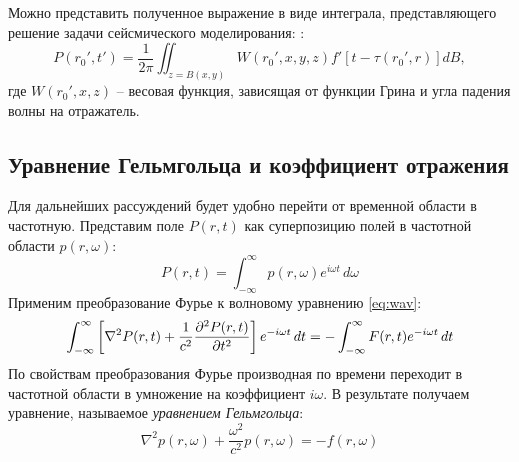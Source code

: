 \documentclass[a4paper, fontsize=14pt]{article}
\begin{document}
Можно представить полученное выражение в виде интеграла, представляющего решение задачи сейсмического моделирования: \cite{pokr}:
\begin{equation}
	P(r_0',t') = \frac{1}{2\pi} \iint_{z=B(x,y)} W(r_0',x,y,z) f'[t-\tau(r_0',r)] dB,
	\label{eq:modpokr}
\end{equation}
где $W(r_0',x,z)$ -- весовая функция, зависящая от функции Грина и угла падения волны на отражатель.
	\subsection{Уравнение Гельмгольца и коэффициент отражения}
	Для дальнейших рассуждений будет удобно перейти от временной области в частотную. Представим поле $P(r,t)$ как суперпозицию полей в частотной области $p(r,\omega)$:
	\begin{equation}
		P(r,t) =  \int_{-\infty}^{\infty} p(r,\omega) e^{i\omega t}\, d\omega
	\end{equation}
	Применим преобразование Фурье к волновому уравнению \eqref{eq:wav}:
	\begin{equation}
		\int_{-\infty}^{\infty} \left[ \nabla^2 P(r,t) + \frac{1}{c^2}\diff[2]{P(r,t)}{t}\right] e^{-i\omega t} \, dt = - \int_{-\infty}^{\infty}   F(r,t) e^{-i\omega t} \, dt
	\end{equation}
	По свойствам преобразования Фурье производная по времени переходит в частотной области в умножение на коэффициент 
	$i\omega$. В результате получаем уравнение, называемое {\it уравнением Гельмгольца}:
	\begin{equation}
		\nabla^2 p(r,\omega) + \frac{\omega^2}{c^2}p(r,\omega) = - f(r,\omega)
		\label{eq:helmholtz}
	\end{equation}

\end{document}
